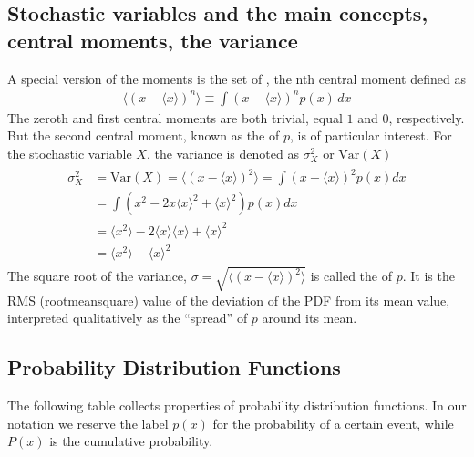 \documentclass[letterpaper,10pt,english]{sphinxmanual}
\begin{document}
\subsection{Stochastic variables and the main concepts, central moments, the variance}
\label{\detokenize{chapter2:stochastic-variables-and-the-main-concepts-central-moments-the-variance}}
A special version of the moments is the set of , the n\sphinxhyphen{}th central moment defined as
\begin{equation*}
\begin{split}
\langle (x-\langle x\rangle )^n\rangle  \equiv \int\! (x-\langle x\rangle)^n p(x)\,dx
\end{split}
\end{equation*}
The zero\sphinxhyphen{}th and first central moments are both trivial, equal \(1\) and
\(0\), respectively. But the second central moment, known as the
 of \(p\), is of particular interest. For the stochastic
variable \(X\), the variance is denoted as \(\sigma^2_X\) or \(\mathrm{Var}(X)\)
\begin{equation*}
\begin{split}
\begin{align*}
\sigma^2_X &=\mathrm{Var}(X) =  \langle (x-\langle x\rangle)^2\rangle  =
\int (x-\langle x\rangle)^2 p(x)dx\\
& =  \int\left(x^2 - 2 x \langle x\rangle^{2} +\langle x\rangle^2\right)p(x)dx\\
& =  \langle x^2\rangle - 2 \langle x\rangle\langle x\rangle + \langle x\rangle^2\\
& =  \langle x^2 \rangle - \langle x\rangle^2
\end{align*}
\end{split}
\end{equation*}
The square root of the variance, \(\sigma =\sqrt{\langle (x-\langle x\rangle)^2\rangle}\) is called the
 of \(p\). It is the RMS (root\sphinxhyphen{}mean\sphinxhyphen{}square)
value of the deviation of the PDF from its mean value, interpreted
qualitatively as the “spread” of \(p\) around its mean.


\subsection{Probability Distribution Functions}
\label{\detokenize{chapter2:probability-distribution-functions}}
The following table collects properties of probability distribution functions.
In our notation we reserve the label \(p(x)\) for the probability of a certain event,
while \(P(x)\) is the cumulative probability.
\end{document}
